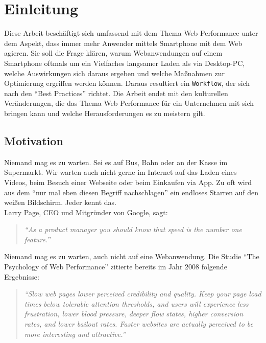 \setcounter{page}{1}

\section{Einleitung} %
\label{sec:einleitung}
	Diese Arbeit beschäftigt sich umfassend mit dem Thema Web Performance unter dem Aspekt, dass immer mehr Anwender mittels Smartphone mit dem Web agieren. Sie soll die Frage klären, warum Webanwendungen auf einem Smartphone oftmals um ein Vielfaches langsamer Laden als via Desktop-PC, welche Auswirkungen sich daraus ergeben und welche Maßnahmen zur Optimierung ergriffen werden können. Daraus resultiert ein \texttt{Workflow}, der sich nach den "`Best Practices"' richtet. Die Arbeit endet mit den kulturellen Veränderungen, die das Thema Web Performance für ein Unternehmen mit sich bringen kann und welche Herausforderungen es zu meistern gilt.

	\subsection{Motivation} %
	\label{sub:motivation}

		Niemand mag es zu warten. Sei es auf Bus, Bahn oder an der Kasse im Supermarkt. Wir warten auch nicht gerne im Internet auf das Laden eines Videos, beim Besuch einer Webseite oder beim Einkaufen via App. Zu oft wird aus dem "`nur mal eben diesen Begriff nachschlagen"' ein endloses Starren auf den weißen Bildschirm. Jeder kennt das.\\

		Larry Page, CEO und Mitgründer von Google, sagt:
		\begin{quote}
			\textit{"`As a product manager you should know that speed is the number one feature."'}\autocite{holzle10}
		\end{quote}
		Niemand mag es zu warten, auch nicht auf eine Webanwendung. Die Studie "`The Psychology of Web Performance"' zitierte bereits im Jahr 2008 folgende Ergebnisse:

		\begin{quote}\itshape
			"`Slow web pages lower perceived credibility and quality. Keep your page load times below tolerable attention thresholds, and users will experience less frustration, lower blood pressure, deeper flow states, higher conversion rates, and lower bailout rates. Faster websites are actually perceived to be more interesting and attractive."' \autocite{webOpti08}
		\end{quote}

